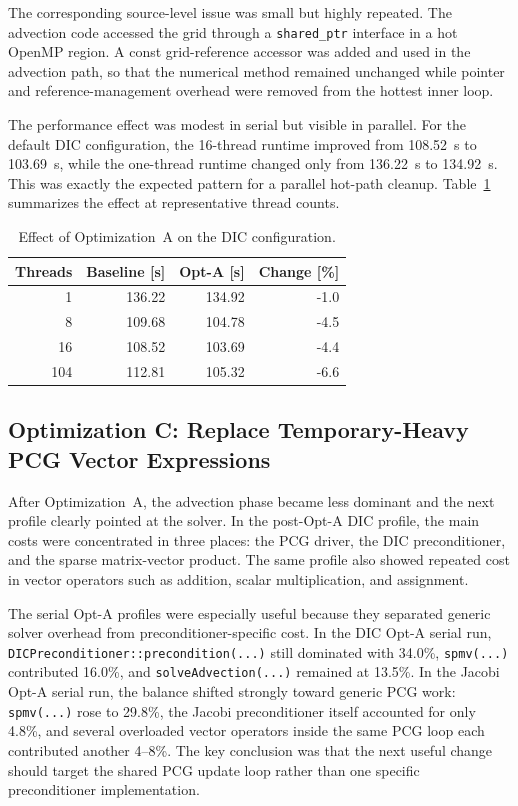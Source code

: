 \documentclass[10pt,firstlineindent,nopartpage,article,accentcolor=tud1b]{tudreport}
\begin{document}
The corresponding source-level issue was small but highly repeated. The
advection code accessed the grid through a \texttt{shared\_ptr} interface in a
hot OpenMP region. A const grid-reference accessor was added and used in the
advection path, so that the numerical method remained unchanged while pointer
and reference-management overhead were removed from the hottest inner loop.

The performance effect was modest in serial but visible in parallel. For the
default DIC configuration, the 16-thread runtime improved from \SI{108.52}{s}
to \SI{103.69}{s}, while the one-thread runtime changed only from
\SI{136.22}{s} to \SI{134.92}{s}. This was exactly the expected pattern for a
parallel hot-path cleanup. Table~\ref{tab:opt-a-effect} summarizes the effect
at representative thread counts.

\begin{table}[H]
\centering
\caption{Effect of Optimization~A on the DIC configuration.}
\label{tab:opt-a-effect}
\begin{tabular}{rrrr}
\toprule
Threads & Baseline [s] & Opt-A [s] & Change [\%] \\
\midrule
1   & 136.22 & 134.92 & -1.0 \\
8   & 109.68 & 104.78 & -4.5 \\
16  & 108.52 & 103.69 & -4.4 \\
104 & 112.81 & 105.32 & -6.6 \\
\bottomrule
\end{tabular}
\end{table}

\subsection{Optimization C: Replace Temporary-Heavy PCG Vector Expressions}
After Optimization~A, the advection phase became less dominant and the next
profile clearly pointed at the solver. In the post-Opt-A DIC profile, the main
costs were concentrated in three places: the PCG driver, the DIC
preconditioner, and the sparse matrix-vector product. The same profile also
showed repeated cost in vector operators such as addition, scalar
multiplication, and assignment.

The serial Opt-A profiles were especially useful because they separated generic
solver overhead from preconditioner-specific cost. In the DIC Opt-A serial run,
\texttt{DICPreconditioner::precondition(...)} still dominated with 34.0\%,
\texttt{spmv(...)} contributed 16.0\%, and
\texttt{solveAdvection(...)} remained at 13.5\%. In the Jacobi Opt-A serial
run, the balance shifted strongly toward generic PCG work:
\texttt{spmv(...)} rose to 29.8\%, the Jacobi preconditioner itself accounted
for only 4.8\%, and several overloaded vector operators inside the same PCG
loop each contributed another 4--8\%. The key conclusion was that the next
useful change should target the shared PCG update loop rather than one specific
preconditioner implementation.
\end{document}
